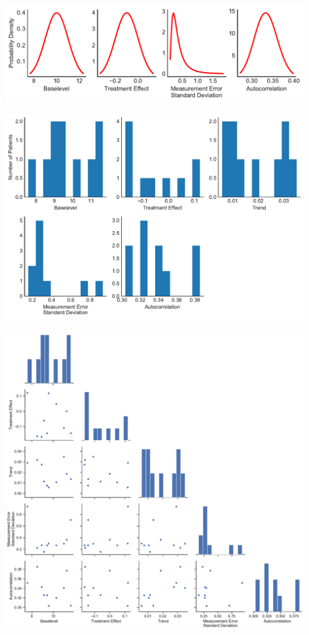 \documentclass[12pt,a4paper,leqno]{report}
\theoremstyle{plain}
\theoremstyle{definition}
\theoremstyle{remark}
\begin{document}
\bigskip
{
    \centering
    \includegraphics[width=\textwidth,height=\textheight,keepaspectratio]{population_parameter_distributions.pdf}
    \par
}
\bigskip

\bigskip
{
    \centering
    \includegraphics[width=\textwidth,height=\textheight,keepaspectratio]{patient_parameter_distribution.pdf}
    \par
}
\bigskip

\bigskip
{
    \centering
    \includegraphics[width=\textwidth,height=\textheight,keepaspectratio]{patient_parameter_relationships.pdf}
    \par
}
\bigskip
\end{document}
